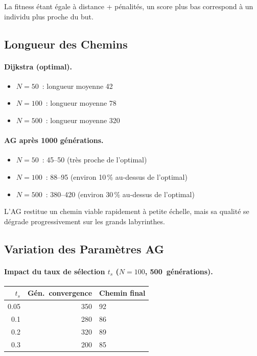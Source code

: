\documentclass[12pt, a4paper]{article}
\theoremstyle{definition}
\theoremstyle{remark}
\begin{document}
La fitness étant égale à distance + pénalités, un score plus bas correspond à un
individu plus proche du but.

\subsection{Longueur des Chemins}

\paragraph{Dijkstra (optimal).}
\begin{itemize}[noitemsep]
    \item $N=50$~: longueur moyenne 42
    \item $N=100$~: longueur moyenne 78
    \item $N=500$~: longueur moyenne 320
\end{itemize}

\paragraph{AG après 1000 générations.}
\begin{itemize}[noitemsep]
    \item $N=50$~: 45–50 (très proche de l'optimal)
    \item $N=100$~: 88–95 (environ 10\,\% au-dessus de l'optimal)
    \item $N=500$~: 380–420 (environ 30\,\% au-dessus de l'optimal)
\end{itemize}

L'AG restitue un chemin viable rapidement à petite échelle, mais sa qualité se
dégrade progressivement sur les grands labyrinthes.

\subsection{Variation des Paramètres AG}

\paragraph{Impact du taux de sélection $t_s$ ($N=100$, 500~générations).}

\begin{center}
\begin{tabular}{rrl}
    \toprule
    $t_s$ & Gén.~convergence & Chemin final \\
    \midrule
    0.05 & 350 & 92 \\
    0.1  & 280 & 86 \\
    0.2  & 320 & 89 \\
    0.3  & 200 & 85 \\
    \bottomrule
\end{tabular}
\end{center}
\end{document}
